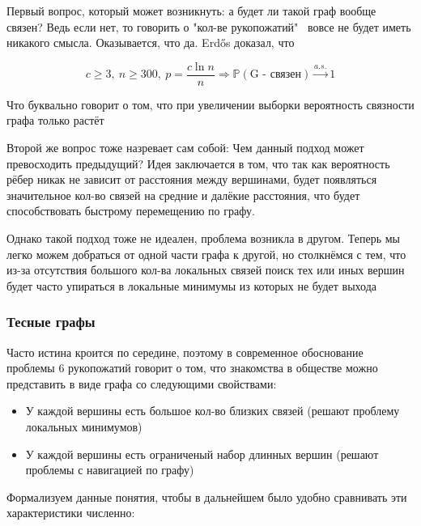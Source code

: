 Первый вопрос, который может возникнуть: а будет ли такой граф вообще
связен? Ведь если нет, то говорить о "кол-ве рукопожатий" \ вовсе не 
будет иметь никакого смысла. Оказывается, что да. Erdős доказал, что

\begin{equation}
    c \ge 3, \ n \ge 300, \ p = \frac{c\ln{n}}{n} \Rightarrow \mathbb{P}
    (\text{G - связен}) \xrightarrow{a.s.} 1
\end{equation}

Что буквально говорит о том, что при увеличении выборки вероятность
связности графа только растёт

Второй же вопрос тоже назревает сам собой: Чем данный подход может
превосходить предыдущий? Идея заключается в том, что так как вероятность 
рёбер никак не зависит от расстояния между вершинами, будет 
появляться значительное кол-во связей на средние и далёкие расстояния, что
будет способствовать быстрому перемещению по графу.

Однако такой подход тоже не идеален, проблема возникла в другом. Теперь
мы легко можем добраться от одной части графа к другой, но столкнёмся
с тем, что из-за отсутствия большого кол-ва локальных связей поиск тех 
или иных вершин будет часто упираться в локальные минимумы из которых не 
будет выхода

\subsubsection{Тесные графы}

Часто истина кроится по середине, поэтому в современное обоснование
проблемы 6 рукопожатий говорит о том, что знакомства в обществе можно
представить в виде графа со следующими свойствами:

\begin{itemize}
    \item У каждой вершины есть большое кол-во близких связей 
(решают проблему локаль\-ных минимумов)
    \item У каждой вершины есть ограниченый набор длинных вершин
(решают проблемы с навигацией по графу) 
\end{itemize}

Формализуем данные понятия, чтобы в дальнейшем было удобно 
сравнивать эти ха\-рактеристики численно:















